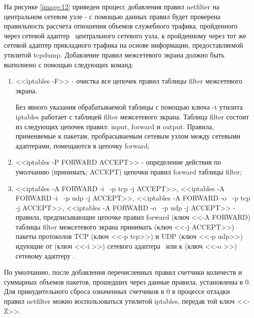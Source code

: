	На рисунке \ref{image:12} приведен процесс добавления правил netfilter на центральном сетевом узле -
	с помощью данных правил будет проверена правильность рассчета отношения объемов служебного трафика,
	пройденного через сетевой адаптер \midethf\ центрального сетевого узла, к пройденному через тот же сетевой адаптер
	прикладного трафика на основе информации, предоставляемой утилитой tcpdump.
	Добавление правил межсетевого экрана должно быть выполнено с помощью следующих команд:

	\begin{enumerate}

		\item <<iptables -F>> - очистка все цепочек правил таблицы filter межсетевого экрана.
		
		Без явного указания обрабатываемой таблицы с помощью ключа -t утилита iptables работает с таблицей filter
		межсетевого экрана. Таблица filter состоит из следующих цепочек правил: input, forward и output. Правила,
		применяемые к пакетам, пробрасываемым сетевым узлом между сетевыми адаптерами, помещаются в цепочку forward;

		\item <<iptables -P FORWARD ACCEPT>> - определение действия по умолчанию (принимать; ACCEPT) цепочки правил
		forward таблицы filter;

		\item <<iptables -A FORWARD -i \midethf\ -p tcp -j ACCEPT>>,
		<<iptables -A FORWARD -i \midethf\ -p udp -j ACCEPT>>,
		<<iptables -A FORWARD -o \midethf\ -p tcp -j ACCEPT>>, <<iptables -A FORWARD -o \midethf\ -p udp -j ACCEPT>> -
		правила, предписывающие цепочке правил forward (ключ <<-A FORWARD) таблицы filter межсетевого экрана принимать
		(ключ <<-j ACCEPT>>) пакеты протоколов TCP (ключ <<-p tcp>>) и UDP (ключ <<-p udp>>) идующие от (ключ
		<<-i \midethf>>) сетевого адаптера \midethf\ или к (ключ <<-o \midethf>>) сетевому адаптеру \midethf.

	\end{enumerate}

	По умолчанию, после добавления перечисленных правил счетчики количеств и суммарных объемов пакетов, прошедших через
	данные правила, установлены в 0. Для принудительного сброса означенных счетчиков в 0 в процессе отладки правил
	netfilter можно воспользоваться утилитой iptables, передав той ключ <<-Z>>.


